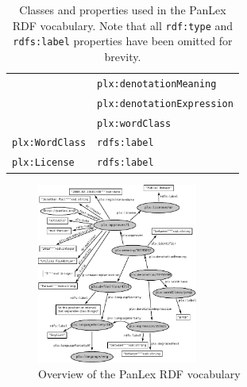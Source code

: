 \documentclass[sw]{iosart2c}
\begin{document}
\begin{table}
\begin{scriptsize}
\begin{tabular}{ll}
                      & \texttt{plx:denotationMeaning} \\
                      & \texttt{plx:denotationExpression} \\
                      & \texttt{plx:wordClass} \\
\midrule
\texttt{plx:WordClass}  
                      & \texttt{rdfs:label} \\
\midrule
\texttt{plx:License}  & \texttt{rdfs:label} \\
\bottomrule
\end{tabular}
\end{scriptsize}
\caption{Classes and properties used in the PanLex RDF vocabulary. Note that all \texttt{rdf:type} and \texttt{rdfs:label} properties have been omitted for brevity.}
\label{tbl:vocabulary}
\end{table}

\begin{figure}
\includegraphics[width=0.47\textwidth]{images/pdf/ontology.pdf}
\caption{Overview of the PanLex RDF vocabulary}
\label{fig:vocabulary}
\end{figure}
\end{document}

